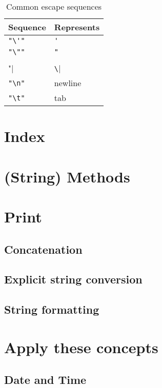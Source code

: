 	\begin{table}[htb]
		\centering
		\caption{Common escape sequences}\label{table:escape}
		\begin{tabular}{ l | l }
			Sequence	& Represents 	\\ \hline
			\lstinline|"\'"|	& \verb|'|	\\ \hline
			\lstinline|"\""|	& \verb|"|	\\ \hline
			\lstinline|"\\"|	& \verb|\|	\\ \hline
			\lstinline|"\n"|	& newline	\\ \hline
			\lstinline|"\t"|	& tab	\\
		\end{tabular}
	\end{table}
	
	\section{Index}
	
	
	\section{(String) Methods}
	
	
	\section{Print}
	
		\subsection{Concatenation}
		
		\subsection{Explicit string conversion}
		
		\subsection{String formatting}
		
	\section{Apply these concepts}
	
		\subsection{Date and Time}
		
